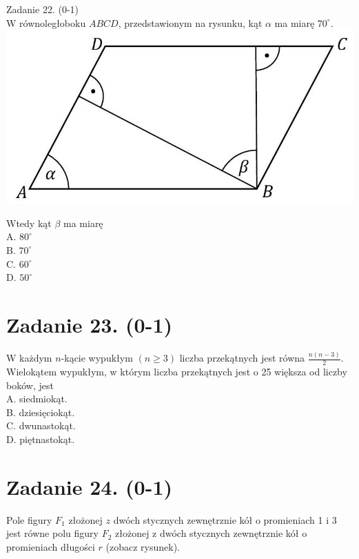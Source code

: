 \documentclass[10pt]{article}
\begin{document}
Zadanie 22. (0-1)\\
W równoległoboku \(A B C D\), przedstawionym na rysunku, kąt \(\alpha\) ma miarę \(70^{\circ}\).\\
\includegraphics[max width=\textwidth, center]{2024_11_21_46d945490f1b2eff1c8eg-12(2)}

Wtedy kąt \(\beta\) ma miarę\\
A. \(80^{\circ}\)\\
B. \(70^{\circ}\)\\
C. \(60^{\circ}\)\\
D. \(50^{\circ}\)

\section*{Zadanie 23. (0-1)}
W każdym \(n\)-kącie wypukłym \((n \geq 3)\) liczba przekątnych jest równa \(\frac{n(n-3)}{2}\). Wielokątem wypukłym, w którym liczba przekątnych jest o 25 większa od liczby boków, jest\\
A. siedmiokąt.\\
B. dziesięciokąt.\\
C. dwunastokąt.\\
D. piętnastokąt.

\section*{Zadanie 24. (0-1)}
Pole figury \(F_{1}\) złożonej \(z\) dwóch stycznych zewnętrznie kół o promieniach 1 i 3 jest równe polu figury \(F_{2}\) złożonej z dwóch stycznych zewnętrznie kół o promieniach długości \(r\) (zobacz rysunek).
\end{document}
